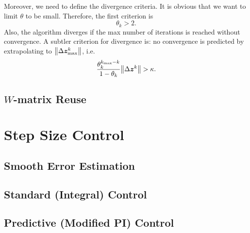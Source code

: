 \documentclass[a4paper,9pt]{article}
\theoremstyle{definition}
\theoremstyle{remark}
\begin{document}
Moreover, we need to define the divergence criteria. It is obvious that we want
to limit $\theta$ to be small. Therefore, the first criterion is
\begin{equation}
  \theta_k > 2.
\end{equation}
Also, the algorithm diverges if the max number of iterations is reached without
convergence. A subtler criterion for divergence is: no convergence is predicted
by extrapolating to $\norm{\Delta\bm{z}^k_{\max}}$, i.e.
\begin{equation}
  \frac{\theta_k^{k_{\max}-k}}{1-\theta_k} \norm{\Delta\bm{z}^k} > \kappa.
\end{equation}

\subsection{$W$-matrix Reuse}

\section{Step Size Control}
\subsection{Smooth Error Estimation}
\subsection{Standard (Integral) Control}
\subsection{Predictive (Modified PI) Control}

\nocite{hairer2010solving}



\end{document}
